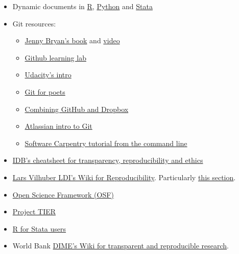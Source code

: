 \documentclass[]{book}
\providecommand{\tightlist}{%
  \setlength{\itemsep}{0pt}\setlength{\parskip}{0pt}}
\begin{document}
\begin{itemize}
\tightlist
\item
  Dynamic documents in \href{https://rmarkdown.rstudio.com/gallery.html}{R}, \href{https://github.com/jupyter/jupyter/wiki/A-gallery-of-interesting-Jupyter-Notebooks\#economics-and-finance}{Python} and \href{https://github.com/BITSS/CEGA2019/blob/master/03-extra_dynamic_docs/02b-Stata-markdown/Stata\%20Markdown.pdf}{Stata}\\
\item
  Git resources:

  \begin{itemize}
  \tightlist
  \item
    \href{https://happygitwithr.com}{Jenny Bryan's book} and \href{https://www.rstudio.com/resources/videos/happy-git-and-gihub-for-the-user-tutorial/}{video}\\
  \item
    \href{https://lab.github.com/}{Github learning lab}
  \item
    \href{https://www.udacity.com/course/how-to-use-git-and-github--ud775}{Udacity's intro}\\
  \item
    \href{https://www.youtube.com/playlist?list=PLRqwX-V7Uu6ZF9C0YMKuns9sLDzK6zoiV}{Git for poets}\\
  \item
    \href{https://github.com/kbjarkefur/GitHubDropBox}{Combining GitHub and Dropbox}\\
  \item
    \href{https://www.atlassian.com/git/tutorials}{Atlassian intro to Git}
  \item
    \href{https://swcarpentry.github.io/git-novice/}{Software Carpentry tutorial from the command line}
  \end{itemize}
\item
  \href{http://idbdocs.iadb.org/wsdocs/getdocument.aspx?docnum=EZSHARE-1350314980-383}{IDB's cheatsheet for transparency, reproducibility and ethics}\\
\item
  \href{https://github.com/labordynamicsinstitute/replicability-training/wiki}{Lars Vilhuber LDI's Wiki for Reproducibility}. Particularly \href{https://github.com/labordynamicsinstitute/replicability-training/wiki/Prepare_and_run_replication}{this section}.\\
\item
  \href{https://osf.io}{Open Science Framework (OSF)}
\item
  \href{https://www.projecttier.org/tier-protocol/}{Project TIER}\\
\item
  \href{https://github.com/hblackburn/R4Econ/blob/master/Resources.md}{R for Stata users}\\
\item
  World Bank \href{https://dimewiki.worldbank.org/wiki/Main_Page}{DIME's Wiki for transparent and reproducible research}.
\end{itemize}
\end{document}
